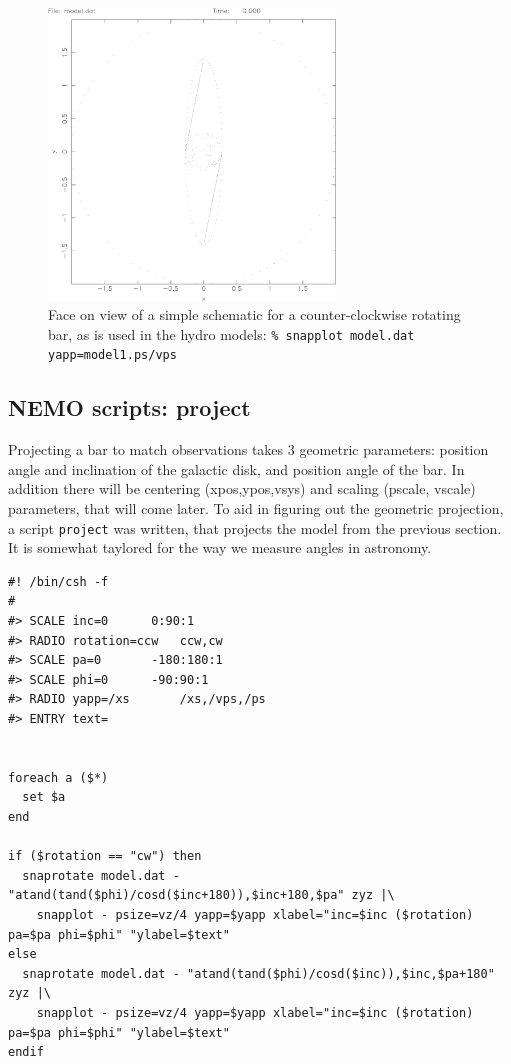 \documentclass[10pt,dvips]{article}
\begin{document}
\begin{figure}[htbp]
\centering
\includegraphics[width=3in]{model1.ps}
\caption{Face on view of a simple schematic for a counter-clockwise
rotating bar, as is used in the hydro models:\newline
 \tt \% snapplot model.dat yapp=model1.ps/vps
}
\end{figure}

\subsection{NEMO scripts: project}
 
Projecting a bar to match observations takes 3 geometric parameters:
position angle and inclination of the galactic disk, and position
angle of the bar. In addition there will be centering (xpos,ypos,vsys)
and scaling (pscale, vscale) parameters, that will come later. To
aid in figuring out the geometric projection, a script {\tt project}
was written, that projects the model from the previous section. It
is somewhat taylored for the way we measure angles in astronomy.

\footnotesize\begin{verbatim}
#! /bin/csh -f 
#
#> SCALE inc=0		0:90:1
#> RADIO rotation=ccw   ccw,cw
#> SCALE pa=0		-180:180:1
#> SCALE phi=0		-90:90:1
#> RADIO yapp=/xs       /xs,/vps,/ps
#> ENTRY text=  


foreach a ($*)
  set $a
end

if ($rotation == "cw") then
  snaprotate model.dat - "atand(tand($phi)/cosd($inc+180)),$inc+180,$pa" zyz |\
    snapplot - psize=vz/4 yapp=$yapp xlabel="inc=$inc ($rotation) pa=$pa phi=$phi" "ylabel=$text"
else
  snaprotate model.dat - "atand(tand($phi)/cosd($inc)),$inc,$pa+180" zyz |\
    snapplot - psize=vz/4 yapp=$yapp xlabel="inc=$inc ($rotation) pa=$pa phi=$phi" "ylabel=$text"
endif

\end{verbatim}\normalsize
\end{document}
